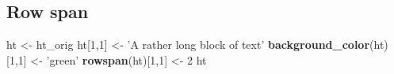 \documentclass[]{article}
\newenvironment{Shaded}{\begin{snugshade}}{\end{snugshade}}
\newcommand{\KeywordTok}[1]{\textcolor[rgb]{0.13,0.29,0.53}{\textbf{{#1}}}}
\newcommand{\DecValTok}[1]{\textcolor[rgb]{0.00,0.00,0.81}{{#1}}}
\newcommand{\StringTok}[1]{\textcolor[rgb]{0.31,0.60,0.02}{{#1}}}
\newcommand{\NormalTok}[1]{{#1}}
\begin{document}
\FloatBarrier

\subsection{Row span}\label{row-span}

\begin{Shaded}
\begin{Highlighting}[]
\NormalTok{ht <-}\StringTok{ }\NormalTok{ht_orig}
\NormalTok{ht[}\DecValTok{1}\NormalTok{,}\DecValTok{1}\NormalTok{] <-}\StringTok{ 'A rather long block of text'}
\KeywordTok{background_color}\NormalTok{(ht)[}\DecValTok{1}\NormalTok{,}\DecValTok{1}\NormalTok{] <-}\StringTok{ 'green'}
\KeywordTok{rowspan}\NormalTok{(ht)[}\DecValTok{1}\NormalTok{,}\DecValTok{1}\NormalTok{] <-}\StringTok{ }\DecValTok{2}
\NormalTok{ht   }
\end{Highlighting}
\end{Shaded}
\end{document}
